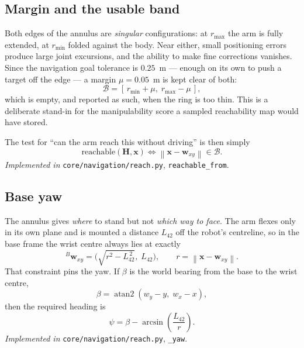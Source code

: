 \documentclass[11pt,a4paper]{article}
\newcommand{\norm}[1]{\left\lVert #1 \right\rVert}
\begin{document}
\subsection{Margin and the usable band}

Both edges of the annulus are \emph{singular} configurations: at $r_{\max}$ the
arm is fully extended, at $r_{\min}$ folded against the body. Near either, small
positioning errors produce large joint excursions, and the ability to make fine
corrections vanishes. Since the navigation goal tolerance is $0.25$~m --- enough
on its own to push a target off the edge --- a margin $\mu = 0.05$~m is kept
clear of both:
\begin{equation}
\mathcal{B} = [\, r_{\min} + \mu, \; r_{\max} - \mu \,],
\end{equation}
which is empty, and reported as such, when the ring is too thin. This is a
deliberate stand-in for the manipulability score a sampled reachability map would
have stored.

The test for ``can the arm reach this without driving'' is then simply
\begin{equation}
\boxed{\;
\text{reachable}(\mathbf{H}, \mathbf{x}) \iff
\norm{\mathbf{x} - \mathbf{w}_{xy}} \in \mathcal{B}.
\;}
\end{equation}
\textit{Implemented in} \texttt{core/navigation/reach.py}, \texttt{reachable\_from}.

\subsection{Base yaw}

The annulus gives \emph{where} to stand but not \emph{which way to face}. The
arm flexes only in its own plane and is mounted a distance $L_{42}$ off the
robot's centreline, so in the base frame the wrist centre always lies at exactly
\begin{equation}
{}^{B}\mathbf{w}_{xy} = \Big(\sqrt{r^2 - L_{42}^{\,2}},\; L_{42}\Big),
\qquad r = \norm{\mathbf{x} - \mathbf{w}_{xy}} .
\label{eq:invariant}
\end{equation}
That constraint pins the yaw. If $\beta$ is the world bearing from the base to
the wrist centre,
\begin{equation}
\beta = \operatorname{atan2}(w_y - y,\; w_x - x),
\end{equation}
then the required heading is
\begin{equation}
\boxed{\;
\psi = \beta - \arcsin\!\left(\frac{L_{42}}{r}\right).
\;}
\end{equation}
\textit{Implemented in} \texttt{core/navigation/reach.py}, \texttt{\_yaw}.
\end{document}
